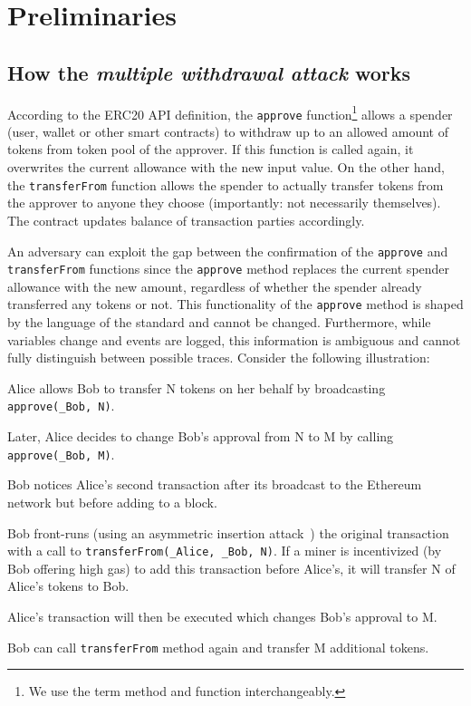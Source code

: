 
\section{Preliminaries}

\subsection{How the \textit{multiple withdrawal attack} works}
According to the ERC20 API definition, the \texttt{approve} function\footnote{We use the term method and function interchangeably.}
allows a spender (\eg user, wallet or other smart contracts) to withdraw up to an allowed amount of tokens from token pool of the approver. If this function is called again, it overwrites the current allowance with the new input value. On the other hand, the \texttt{transferFrom} function allows the spender to actually transfer tokens from the approver to anyone they choose (importantly: not necessarily themselves). The contract updates balance of transaction parties accordingly. 

An adversary can exploit the gap between the confirmation of the \texttt{approve} and \texttt{transferFrom} functions since the \texttt{approve} method replaces the current spender allowance with the new amount, regardless of whether the spender already transferred any tokens or not. This functionality of the \texttt{approve} method is shaped by the language of the standard and cannot be changed. Furthermore, while variables change and events are logged, this information is ambiguous and cannot fully distinguish between possible traces. Consider the following illustration:

\begin{compactlistn}
	\item Alice allows Bob to transfer N tokens on her behalf by broadcasting \texttt{approve(\_Bob, N)}.
	\item Later, Alice decides to change Bob's approval from N to M  by calling \texttt{approve(\_Bob, M)}.
	\item Bob notices Alice's second transaction after its broadcast to the Ethereum network but before adding to a block.
	\item Bob front-runs (using an asymmetric insertion attack~\cite{eskandari2019sok}) the original transaction with a call to \texttt{transferFrom(\_Alice, \_Bob, N)}. If a miner is incentivized (\eg by Bob offering high gas) to add this transaction before Alice's, it will transfer N of Alice's tokens to Bob.
	\item Alice's transaction will then be executed which changes Bob's approval to M.
	\item Bob can call \texttt{transferFrom} method again and transfer M additional tokens.
\end{compactlistn}

